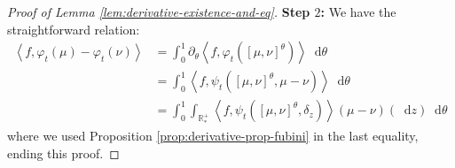 \documentclass[11pt,a4paper]{article}
\newcommand{\RRP}{\mathbb{R}^+_*}
\newcommand{\MC}{\mathcal{M}}
\newcommand{\SCE}{\emph{SCE}}
\newcommand{\Proc}[1]{\left(#1\right)_{t\geq 0}}
\newcommand{\brac}[1]{\left\langle#1\right\rangle}
\newcommand{\dd}{\mathop{}\!\mathrm{d}}
\newtheorem{lemma}[theorem]{Lemma}
\begin{document}
\begin{proof}[Proof of Lemma \ref{lem:derivative-existence-and-eq}]
    \textbf{Step $2$:} We have the straightforward relation:
    \begin{align*}
        \brac{f,\varphi_t(\mu) - \varphi_t(\nu)} &= \int_0^1 \partial_\theta \brac{f,\varphi_t\left(\left[\mu,\nu \right]^\theta\right)} \dd \theta \\
        &= \int_0^1 \brac{f,\psi_t\left(\left[\mu,\nu \right]^\theta,\mu-\nu\right)} \dd \theta \\
        &= \int_0^1 \int_{\RRP} \brac{f,\psi_t\left(\left[\mu,\nu \right]^\theta,\delta_z\right)}(\mu - \nu)(\dd z) \dd \theta
    \end{align*}
    where we used Proposition \ref{prop:derivative-prop-fubini} in the last equality, ending this proof.
\end{proof}


\end{document}
